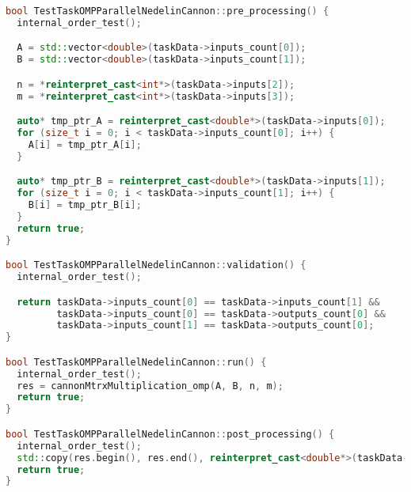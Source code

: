 \documentclass{report}
\begin{document}
\begin{lstlisting}[language=C++,caption=OpenMP версия]
bool TestTaskOMPParallelNedelinCannon::pre_processing() {
  internal_order_test();

  A = std::vector<double>(taskData->inputs_count[0]);
  B = std::vector<double>(taskData->inputs_count[1]);

  n = *reinterpret_cast<int*>(taskData->inputs[2]);
  m = *reinterpret_cast<int*>(taskData->inputs[3]);

  auto* tmp_ptr_A = reinterpret_cast<double*>(taskData->inputs[0]);
  for (size_t i = 0; i < taskData->inputs_count[0]; i++) {
    A[i] = tmp_ptr_A[i];
  }

  auto* tmp_ptr_B = reinterpret_cast<double*>(taskData->inputs[1]);
  for (size_t i = 0; i < taskData->inputs_count[1]; i++) {
    B[i] = tmp_ptr_B[i];
  }
  return true;
}

bool TestTaskOMPParallelNedelinCannon::validation() {
  internal_order_test();

  return taskData->inputs_count[0] == taskData->inputs_count[1] &&
         taskData->inputs_count[0] == taskData->outputs_count[0] &&
         taskData->inputs_count[1] == taskData->outputs_count[0];
}

bool TestTaskOMPParallelNedelinCannon::run() {
  internal_order_test();
  res = cannonMtrxMultiplication_omp(A, B, n, m);
  return true;
}

bool TestTaskOMPParallelNedelinCannon::post_processing() {
  internal_order_test();
  std::copy(res.begin(), res.end(), reinterpret_cast<double*>(taskData->outputs[0]));
  return true;
}
\end{lstlisting}

\newpage
\end{document}
